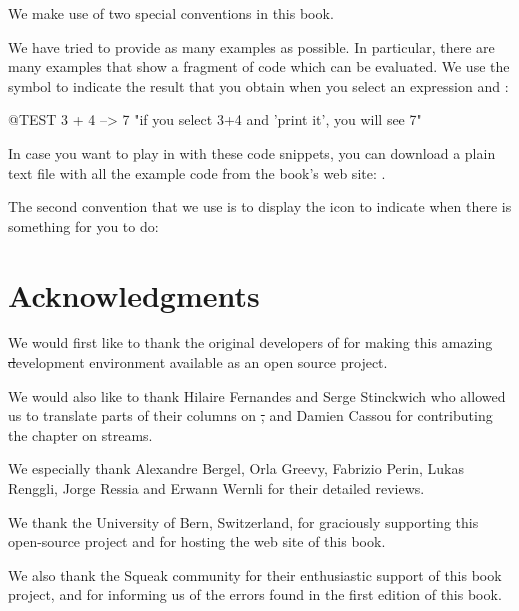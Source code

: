 \documentclass[a4paper,10pt,twoside]{book}
\begin{document}
We make use of two special conventions in this book.

We have tried to provide as many examples as possible.
In particular, there are many examples that show a fragment of code which can be evaluated.  We use the symbol \ct{-->} to indicate the result that you obtain when you select an expression and :

\begin{code}{@TEST}
3 + 4 --> 7    "if you select 3+4 and 'print it', you will see 7"
\end{code}

In case you want to play in \pharo with these code snippets, you can download a plain text file with all the example code from the book's web site: \pbe.

The second convention that we use is to display the icon \dothisicon{} to indicate when there is something for you to do:


\section*{Acknowledgments}

We would first like to thank the original developers of \squeak for making this amazing \st development environment available as an open source project.

We would also like to thank Hilaire Fernandes and Serge Stinckwich who allowed us to translate parts of their columns on \st, and Damien Cassou for contributing the chapter on streams.

We especially thank Alexandre Bergel, Orla Greevy, Fabrizio Perin, Lukas Renggli, Jorge Ressia and Erwann Wernli for their detailed reviews.

We thank the University of Bern, Switzerland, for graciously supporting this open-source project and for hosting the web site of this book.

We also thank the Squeak community for their enthusiastic support of this book project, and for informing us of the errors found in the first edition of this book.

\ifx\wholebook\relax\else
   
   
\end{document}
